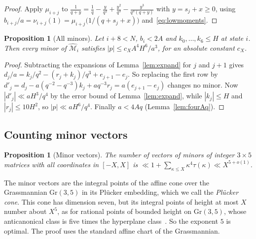 \documentclass[11pt]{article}
\newtheorem{proposition}[theorem]{Proposition}
\theoremstyle{definition}
\theoremstyle{remark}
\begin{document}
\begin{proof}
Apply $\mu_{i+j}$ to $\frac1{q+y}=\frac1q-\frac y{q^2}+\frac{y^2}{q^3}-\frac{y^3}{q^3(q+y)}$ with
$y=s_j+x\ge0$, using $b_{i+j}/a=\nu_{i+j}(1)=\mu_{i+j}\bigl(1/(q+s_j+x)\bigr)$
and~\eqref{eq:lowmoments}.
\end{proof}

\begin{proposition}[All minors]\label{prop:allminors}
Let $i+8<N$, $b_i<2A$ and $k_0,\dots,k_6\le H$ at state $i$. Then every minor of $\widehat{\mathcal M}_i$
satisfies $|p|\le c_XA^4H^6/a^3$, for an absolute constant $c_X$.
\end{proposition}

\begin{proof}
Subtracting the expansions of Lemma~\ref{lem:expand} for $j$ and $j+1$ gives
$d_j/a=k_j/q^2-(r_j+k_j)/q^3+e_{j+1}-e_j$. So replacing the first row by
$d'_j=d_j-a(q^{-2}-q^{-3})k_j+aq^{-3}r_j=a(e_{j+1}-e_j)$ changes no minor. Now
$|d'_j|\ll aH^3/q^4$ by the error bound of Lemma~\ref{lem:expand}, while
$|k_j|\le H$ and $|r_j|\le10H^2$, so $|p|\ll aH^6/q^4$. Finally $a<4Aq$
(Lemma~\ref{lem:fourAq}).
\end{proof}

\subsection{Counting minor vectors}\label{sec:minorcount}

\begin{proposition}[Minor vectors]\label{prop:minorvec}
The number of vectors of minors of integer $3\times5$ matrices with all coordinates in $[-X,X]$ is
$\ll1+\sum_{\kappa\le X}\kappa^4\tau(\kappa)\ll X^{5+o(1)}$.
\end{proposition}

The minor vectors are the integral points of the affine cone over the
Grassmannian $\mathrm{Gr}(3,5)$ in its Pl\"ucker embedding, which we call the
\emph{Pl\"ucker cone}. This cone has
dimension seven, but its integral points of height at most $X$ number about
$X^5$, as for rational points of bounded height on $\mathrm{Gr}(3,5)$, whose
anticanonical class is five times the hyperplane class~\cite{FMT}. So the
exponent $5$ is optimal. The proof uses the standard affine chart of the Grassmannian.
\end{document}

